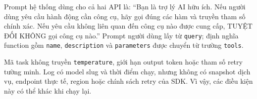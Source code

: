Prompt hệ thống dùng cho cả hai API là: “Bạn là trợ lý AI hữu ích. Nếu người dùng yêu cầu hành động cần công cụ, hãy gọi đúng các hàm và truyền tham số chính xác. Nếu yêu cầu không liên quan đến công cụ nào được cung cấp, TUYỆT ĐỐI KHÔNG gọi công cụ nào.” Prompt người dùng lấy từ \texttt{query}; định nghĩa function gồm \texttt{name}, \texttt{description} và \texttt{parameters} được chuyển từ trường \texttt{tools}.

Mã task không truyền \texttt{temperature}, giới hạn output token hoặc tham số retry tường minh. Log có model slug và thời điểm chạy, nhưng không có snapshot dịch vụ, endpoint thực tế, region hoặc chính sách retry của SDK. Vì vậy, các điều kiện này có thể khác khi chạy lại.

